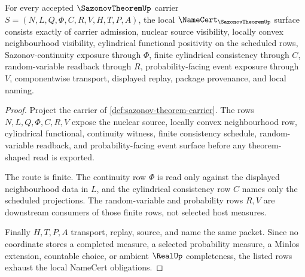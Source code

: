 \begin{theorem}
\label{thm:sazonov-theorem-namecert-obligations}
For every accepted $\SazonovTheoremUp$ carrier $S=(N,L,Q,\Phi,C,R,V,H,T,P,A)$, the local $\NameCert_{\SazonovTheoremUp}$ surface consists exactly of carrier admission, nuclear source visibility, locally convex neighbourhood visibility, cylindrical functional positivity on the scheduled rows, Sazonov-continuity exposure through $\Phi$, finite cylindrical consistency through $C$, random-variable readback through $R$, probability-facing event exposure through $V$, componentwise transport, displayed replay, package provenance, and local naming.
\end{theorem}
\begin{proof}
Project the carrier of \autoref{def:sazonov-theorem-carrier}. The rows $N,L,Q,\Phi,C,R,V$ expose the nuclear source, locally convex neighbourhood row, cylindrical functional, continuity witness, finite consistency schedule, random-variable readback, and probability-facing event surface before any theorem-shaped read is exported.

The route is finite. The continuity row $\Phi$ is read only against the displayed neighbourhood data in $L$, and the cylindrical consistency row $C$ names only the scheduled projections. The random-variable and probability rows $R,V$ are downstream consumers of those finite rows, not selected host measures.

Finally $H,T,P,A$ transport, replay, source, and name the same packet. Since no coordinate stores a completed measure, a selected probability measure, a Minlos extension, countable choice, or ambient $\RealUp$ completeness, the listed rows exhaust the local NameCert obligations.
\end{proof}



